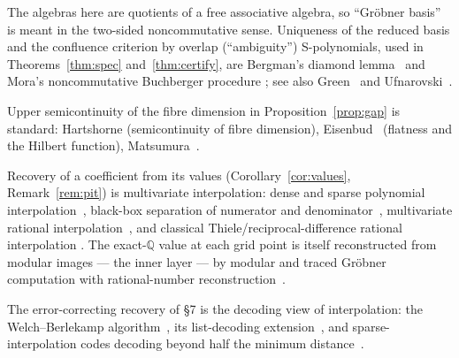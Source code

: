 \documentclass[11pt]{article}
\theoremstyle{definition}
\begin{document}
The algebras here are quotients of a free associative algebra, so ``Gr\"obner basis'' is meant in the
two-sided noncommutative sense. Uniqueness of the reduced basis and the confluence criterion by
overlap (``ambiguity'') S-polynomials, used in Theorems~\ref{thm:spec} and~\ref{thm:certify}, are
Bergman's diamond lemma~\cite{Bergman} and Mora's noncommutative Buchberger procedure
\cite{Mora86,Mora94}; see also Green~\cite{Green} and Ufnarovski~\cite{Ufnarovski}.

Upper semicontinuity of the fibre dimension in Proposition~\ref{prop:gap} is standard: Hartshorne
\cite{Hartshorne} (semicontinuity of fibre dimension), Eisenbud~\cite{Eisenbud} (flatness and the
Hilbert function), Matsumura~\cite{Matsumura}.

Recovery of a coefficient from its values (Corollary~\ref{cor:values}, Remark~\ref{rem:pit}) is
multivariate interpolation: dense and sparse polynomial interpolation~\cite{Zippel,BenOrTiwari},
black-box separation of numerator and denominator~\cite{KaltofenTrager}, multivariate rational
interpolation~\cite{CuytLee}, and classical Thiele/reciprocal-difference rational interpolation
\cite[\S2.2]{StoerBulirsch}. The exact-$\mathbb{Q}$ value at each grid point is itself reconstructed
from modular images --- the inner layer --- by modular and traced Gr\"obner computation
\cite{Traverso,Arnold,NoroYokoyama} with rational-number reconstruction~\cite{WangGuyDavenport}.

The error-correcting recovery of \S7 is the decoding view of interpolation: the Welch--Berlekamp
algorithm~\cite{WelchBerlekamp,GemmellSudan}, its list-decoding extension~\cite{GuruswamiSudan}, and
sparse-interpolation codes decoding beyond half the minimum distance~\cite{KaltofenPernet}.
\end{document}
